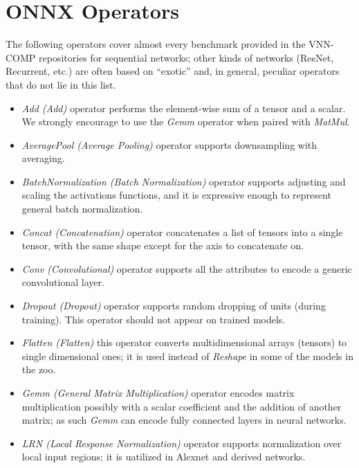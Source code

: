 \section{ONNX Operators}
\label{sec:supported_operators}
The following operators cover almost every benchmark provided in the
VNN-COMP repositories for sequential networks; other kinds of networks
(ResNet, Recurrent, etc.) are often based on ``exotic'' and, in general,
peculiar operators that do not lie in this list.

\begin{itemize}
	\item \emph{Add (Add)} operator performs the element-wise sum of
		a tensor and a scalar. We strongly encourage to use the 
		\textit{Gemm} operator when paired with \textit{MatMul}.
	
	\item \emph{AveragePool (Average Pooling)} operator
	  supports downsampling with averaging.
	
	\item \emph{BatchNormalization (Batch
	  Normalization)} operator supports adjusting and scaling the
	  activations functions, and it is expressive enough to represent
	  general batch normalization.
	  
	\item \emph{Concat (Concatenation)} operator concatenates a list
		of tensors into a single tensor, with the same shape except for
		the axis to concatenate on.	
	
	\item \emph{Conv (Convolutional)} operator supports
	  all the attributes to encode a generic convolutional layer.
	
	\item \emph{Dropout (Dropout)} operator supports
	  random dropping of units (during training). This operator should not
	  appear on trained models.  
	  
	\item \emph{Flatten (Flatten)} this operator converts multidimensional
	  arrays (tensors) to single dimensional ones; it is used instead of
	  \emph{Reshape} in some of the models in the zoo.
	  
	\item \emph{Gemm (General Matrix Multiplication)}
	  operator encodes matrix multiplication possibly with a scalar
	  coefficient and the addition of another matrix; as such \emph{Gemm}
	  can encode fully connected layers in neural networks.
	
	\item \emph{LRN (Local Response Normalization)}
	  operator supports normalization over local input regions; it is uatilized
	  in Alexnet and derived networks.
	  

\end{itemize}

